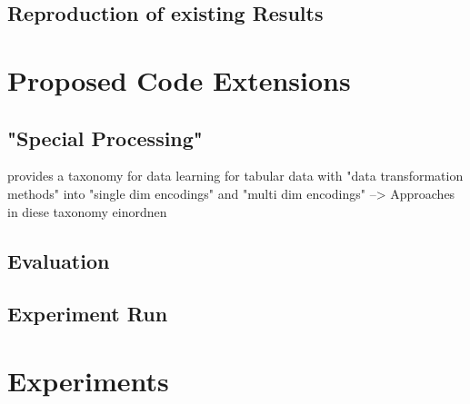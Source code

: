 \subsection{Reproduction of existing Results}
\label{ch:conceptualDesign-existingCodeBase-reproductionOfExistingResults}

\section{Proposed Code Extensions}
\label{ch:conceptualDesign-codeExtensions}

\subsection{"Special Processing"}
\label{ch:conceptualDesign-codeExtensions-dataPreprocessing}

\cite{borisov2022DeepNeuralNetworks} provides a taxonomy for data learning for tabular data with "data transformation methods" into "single dim encodings" and "multi dim encodings" 
--> Approaches in diese taxonomy einordnen



\subsection{Evaluation}
\label{ch:conceptualDesign-codeExtensions-evaluation}


\subsection{Experiment Run}
\label{ch:conceptualDesign-codeExtensions-experimentRun}


\section{Experiments}

